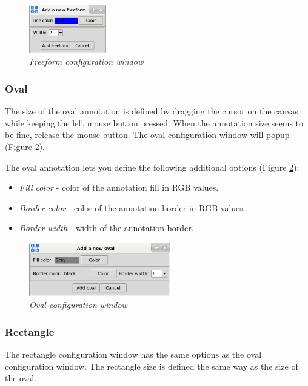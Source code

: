 \begin{figure}[H]
	\centering
	\vspace{10pt}
	\includegraphics[width=0.30\textwidth]{./images/freeform_conf.png}
	\caption{\emph{Freeform configuration window}}
	\label{fig:freeform_conf}
\end{figure}

\subsubsection{Oval}
The size of the oval annotation is defined by dragging the cursor on the canvas
while keeping the left mouse button pressed. When the annotation size seems to
be fine, release the mouse button. The oval configuration window will popup
(Figure \ref{fig:oval_conf}).

The oval annotation lets you define the following additional options (Figure
\ref{fig:oval_conf}):
\begin{itemize}
    \item \emph{Fill color} - color of the annotation fill in RGB values.
    \item \emph{Border color} - color of the annotation border in RGB values.
    \item \emph{Border width} - width of the annotation border.
\end{itemize}

\begin{figure}[H]
	\centering
	\vspace{10pt}
	\includegraphics[width=0.55\textwidth]{./images/oval_conf.png}
	\caption{\emph{Oval configuration window}}
	\label{fig:oval_conf}
\end{figure}

\subsubsection{Rectangle}
The rectangle configuration window has the same options as the oval
configuration window. The rectangle size is defined the same way as the size of
the oval.

